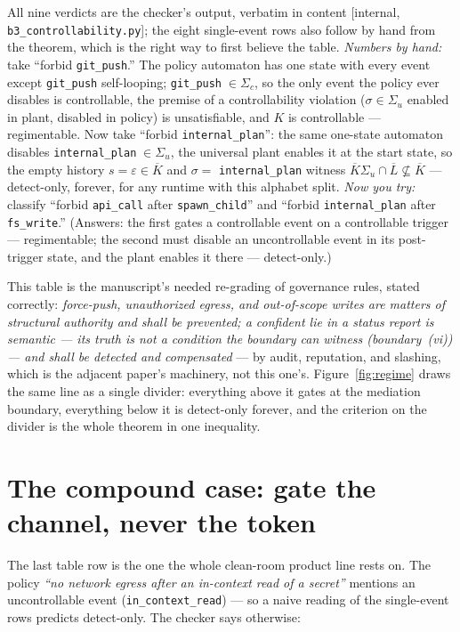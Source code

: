 \documentclass[11pt,a4paper]{article}  \usepackage{mdframed} \usepackage{graphicx}
\begin{document}
\noindent All nine verdicts are the checker's output, verbatim in content [internal, \texttt{b3\_controllability.py}]; the
eight single-event rows also follow by hand from the theorem, which is the right way to first believe the table.
\emph{Numbers by hand:} take ``forbid \texttt{git\_push}.'' The policy automaton has one state with every event except
\texttt{git\_push} self-looping; \texttt{git\_push}$\;\in\Sigma_c$, so the only event the policy ever disables is
controllable, the premise of a controllability violation ($\sigma\in\Sigma_u$ enabled in plant, disabled in policy) is
unsatisfiable, and $K$ is controllable --- regimentable. Now take ``forbid \texttt{internal\_plan}'': the same one-state
automaton disables \texttt{internal\_plan}$\;\in\Sigma_u$, the universal plant enables it at the start state, so the empty
history $s=\varepsilon\in\overline{K}$ and $\sigma=$ \texttt{internal\_plan} witness
$\overline{K}\Sigma_u\cap\overline{L}\not\subseteq\overline{K}$ --- detect-only, forever, for any runtime with this alphabet
split. \emph{Now you try:} classify ``forbid \texttt{api\_call} after \texttt{spawn\_child}'' and ``forbid
\texttt{internal\_plan} after \texttt{fs\_write}.'' (Answers: the first gates a controllable event on a controllable trigger
--- regimentable; the second must disable an uncontrollable event in its post-trigger state, and the plant enables it there
--- detect-only.)

This table is the manuscript's needed re-grading of governance rules, stated correctly: \emph{force-push, unauthorized
egress, and out-of-scope writes are matters of structural authority and shall be prevented; a confident lie in a status
report is semantic --- its truth is not a condition the boundary can witness (boundary~(vi)) --- and shall be detected and
compensated} --- by audit, reputation, and slashing, which is
the adjacent paper's machinery, not this one's. Figure~\ref{fig:regime} draws the same line as a single divider: everything
above it gates at the mediation boundary, everything below it is detect-only forever, and the criterion on the divider is
the whole theorem in one inequality.



\section{The compound case: gate the channel, never the token}\label{sec:compound} The last table row is the one the whole
clean-room product line rests on. The policy \emph{``no network egress after an in-context read of a secret''} mentions an
uncontrollable event (\texttt{in\_context\_read}) --- so a naive reading of the single-event rows predicts detect-only. The
checker says otherwise:
\end{document}
